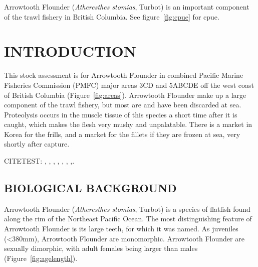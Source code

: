 

Arrowtooth Flounder (\emph{Atheresthes stomias}, Turbot) is an important component of the trawl fishery in British Columbia.
See figure~\ref{fig:cpue} for cpue.




\clearpage

\setcounter{page}{1}

\section{INTRODUCTION}

This stock assessment is for Arrowtooth Flounder in combined Pacific Marine Fisheries Commission (PMFC) major areas 3CD and 5ABCDE off the west coast of British Columbia (Figure~\ref{fig:areas}). Arrowtooth Flounder make up a large component of the trawl fishery, but most are and have been discarded at sea. Proteolysis occurs in the muscle tissue of this species a short time after it is caught, which makes the flesh very mushy and unpalatable. There is a market in Korea for the frills, and a market for the fillets if they are frozen at sea, very shortly after capture.

CITETEST: \citet{arf1995}, \citet{arf1999a}, \citet{arf1999b}, \citet{arf2000}, \citet{arf2001}, \citet{arf2003}, \citet{arf2006},\citet{arf2013}.

\subsection{BIOLOGICAL BACKGROUND}

Arrowtooth Flounder (\emph{Atheresthes stomias}, Turbot) is a species of flatfish found along the rim of the Northeast Pacific Ocean. The most distinguishing feature of Arrowtooth Flounder is its large teeth, for which it was named. As juveniles (<380mm), Arrowtooth Flounder are monomorphic. Arrowtooth Flounder are sexually dimorphic, with adult females being larger than males (Figure~\ref{fig:agelength}).

